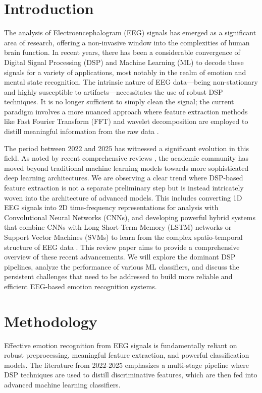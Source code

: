\documentclass[conference]{IEEEtran}
\begin{document}
\section{Introduction}
The analysis of Electroencephalogram (EEG) signals has emerged as a significant area of research, offering a non-invasive window into the complexities of human brain function. In recent years, there has been a considerable convergence of Digital Signal Processing (DSP) and Machine Learning (ML) to decode these signals for a variety of applications, most notably in the realm of emotion and mental state recognition. The intrinsic nature of EEG data—being non-stationary and highly susceptible to artifacts—necessitates the use of robust DSP techniques. It is no longer sufficient to simply clean the signal; the current paradigm involves a more nuanced approach where feature extraction methods like Fast Fourier Transform (FFT) and wavelet decomposition are employed to distill meaningful information from the raw data \cite{b1}.

The period between 2022 and 2025 has witnessed a significant evolution in this field. As noted by recent comprehensive reviews \cite{b3, b5}, the academic community has moved beyond traditional machine learning models towards more sophisticated deep learning architectures. We are observing a clear trend where DSP-based feature extraction is not a separate preliminary step but is instead intricately woven into the architecture of advanced models. This includes converting 1D EEG signals into 2D time-frequency representations for analysis with Convolutional Neural Networks (CNNs), and developing powerful hybrid systems that combine CNNs with Long Short-Term Memory (LSTM) networks or Support Vector Machines (SVMs) to learn from the complex spatio-temporal structure of EEG data \cite{b2, b4}. This review paper aims to provide a comprehensive overview of these recent advancements. We will explore the dominant DSP pipelines, analyze the performance of various ML classifiers, and discuss the persistent challenges that need to be addressed to build more reliable and efficient EEG-based emotion recognition systems.

\section{Methodology}
Effective emotion recognition from EEG signals is fundamentally reliant on robust preprocessing, meaningful feature extraction, and powerful classification models. The literature from 2022-2025 emphasizes a multi-stage pipeline where DSP techniques are used to distill discriminative features, which are then fed into advanced machine learning classifiers.
\end{document}
